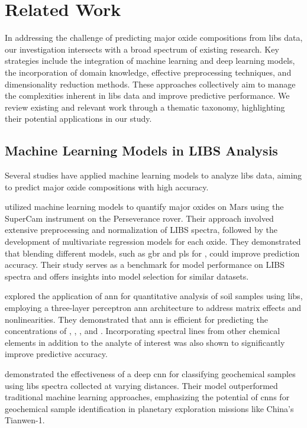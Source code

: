 \section{Related Work}\label{sec:related-work}
In addressing the challenge of predicting major oxide compositions from \gls{libs} data, our investigation intersects with a broad spectrum of existing research.
Key strategies include the integration of machine learning and deep learning models, the incorporation of domain knowledge, effective preprocessing techniques, and dimensionality reduction methods.
These approaches collectively aim to manage the complexities inherent in \gls{libs} data and improve predictive performance.
We review existing and relevant work through a thematic taxonomy, highlighting their potential applications in our study.

\subsection{Machine Learning Models in LIBS Analysis}
Several studies have applied machine learning models to analyze \gls{libs} data, aiming to predict major oxide compositions with high accuracy.

\citet{andersonPostlandingMajorElement2022} utilized machine learning models to quantify major oxides on Mars using the SuperCam instrument on the Perseverance rover.
Their approach involved extensive preprocessing and normalization of LIBS spectra, followed by the development of multivariate regression models for each oxide.
They demonstrated that blending different models, such as \gls{gbr} and \gls{pls} for , could improve prediction accuracy.
Their study serves as a benchmark for model performance on LIBS spectra and offers insights into model selection for similar datasets.

\citet{el_haddad_ann_2013} explored the application of \gls{ann} for quantitative analysis of soil samples using \gls{libs}, employing a three-layer perceptron \gls{ann} architecture to address matrix effects and nonlinearities.
They demonstrated that \gls{ann} is efficient for predicting the concentrations of , , , and .
Incorporating spectral lines from other chemical elements in addition to the analyte of interest was also shown to significantly improve predictive accuracy.

\citet{yangConvolutionalNeuralNetwork2022} demonstrated the effectiveness of a deep \gls{cnn} for classifying geochemical samples using \gls{libs} spectra collected at varying distances.
Their model outperformed traditional machine learning approaches, emphasizing the potential of \gls{cnn}s for geochemical sample identification in planetary exploration missions like China's Tianwen-1.

